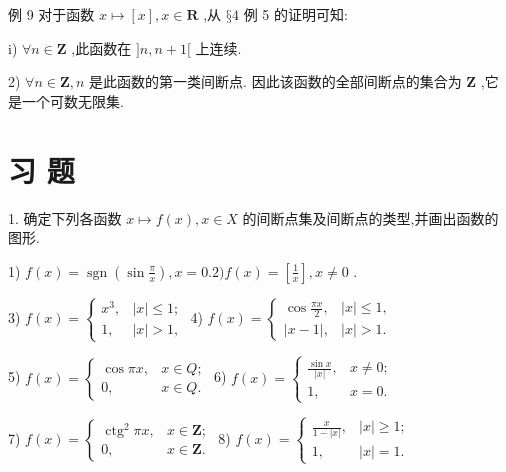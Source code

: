 例 9 对于函数 $x \mapsto  \left\lbrack  x\right\rbrack  ,x \in  \mathbf{R}$ ,从 $§4$ 例 5 的证明可知:

i) $\forall n \in  \mathbf{Z}$ ,此函数在 $\rbrack n,n + 1\lbrack$ 上连续.

2) $\forall n \in  \mathbf{Z},n$ 是此函数的第一类间断点. 因此该函数的全部间断点的集合为 $\mathbf{Z}$ ,它是一个可数无限集.

\section*{习 题}

1. 确定下列各函数 $x \mapsto  f\left( x\right) ,x \in  X$ 的间断点集及间断点的类型,并画出函数的图形.

1) $f\left( x\right)  = \operatorname{sgn}\left( {\sin \frac{\pi }{x}}\right) ,x = {0.2})f\left( x\right)  = \left\lbrack  \frac{1}{x}\right\rbrack  ,x \neq  0$ .

3) $f\left( x\right)  = \left\{  \begin{array}{ll} {x}^{3}, & \left| x\right|  \leq  1; \\  1, & \left| x\right|  > 1, \end{array}\right.$ 4) $f\left( x\right)  = \left\{  \begin{array}{ll} \cos \frac{\pi x}{2}, & \left| x\right|  \leq  1, \\  \left| {x - 1}\right| , & \left| x\right|  > 1. \end{array}\right.$

5) $f\left( x\right)  = \left\{  \begin{array}{ll} \cos {\pi x}, & x \in  Q; \\  0, & x \in  Q. \end{array}\right.$ 6) $f\left( x\right)  = \left\{  \begin{array}{ll} \frac{\sin x}{\left| x\right| }, & x \neq  0; \\  1, & x = 0. \end{array}\right.$

7) $f\left( x\right)  = \left\{  \begin{array}{ll} {\operatorname{ctg}}^{2}{\pi x}, & x \in  \mathbf{Z}; \\  0, & x \in  \mathbf{Z}. \end{array}\right.$ 8) $f\left( x\right)  = \left\{  \begin{array}{ll} \frac{x}{1 - \left| x\right| }, & \left| x\right|  \geq  1; \\  1, & \left| x\right|  = 1. \end{array}\right.$

